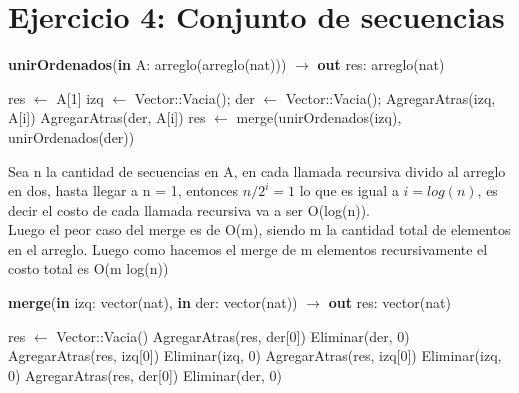 \section{Ejercicio 4: Conjunto de secuencias}
\begin{algorithm}[H]
    \caption{
        \textbf{unirOrdenados}(\textbf{in} A: arreglo(arreglo(nat))) $\to$ \textbf{out} res: arreglo(nat) 
    }
    \begin{algorithmic}[1]
            \State res $\gets$ A[1]
        \Else
            \State izq $\gets$ Vector::Vacia();
            \State der $\gets$ Vector::Vacia();
                    \State AgregarAtras(izq, A[i])
                \Else
                    \State AgregarAtras(der, A[i])
                \EndIf
            \EndFor
            \State res $\gets$ merge(unirOrdenados(izq), unirOrdenados(der))
        \EndIf
    \end{algorithmic}
\end{algorithm}

Sea n la cantidad de secuencias en A, en cada llamada recursiva divido al arreglo en dos, hasta llegar a n = 1, entonces $n/2^{i} = 1$ lo que es igual a $i = log(n)$, es decir el costo de cada llamada recursiva va a ser O(log(n)). \\
Luego el peor caso del merge es de O(m), siendo m la cantidad total de elementos en el arreglo. Luego como hacemos el merge de m elementos recursivamente el costo total es O(m log(n))

\begin{algorithm}[H]
    \caption{
        \textbf{merge}(\textbf{in} izq: vector(nat), \textbf{in} der: vector(nat)) $\to$ \textbf{out} res: vector(nat)
    }
    \begin{algorithmic}[1]
        \State res $\gets$ Vector::Vacia()
                    \State AgregarAtras(res, der[0])
                    \State Eliminar(der, 0)
                \EndWhile
            \Else
                        \State AgregarAtras(res, izq[0])
                        \State Eliminar(izq, 0)
                    \EndWhile
                \Else
                        \State AgregarAtras(res, izq[0])
                        \State Eliminar(izq, 0)
                    \Else
                        \State AgregarAtras(res, der[0])
                        \State Eliminar(der, 0)
                    \EndIf
                \EndIf
            \EndIf
        \EndWhile
    \end{algorithmic}
\end{algorithm}

